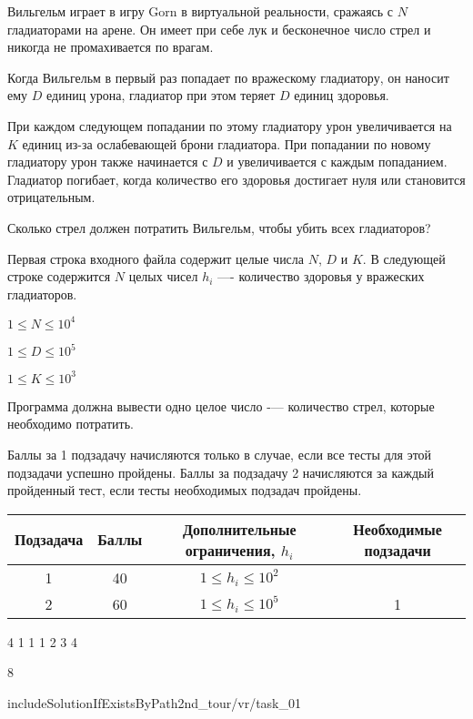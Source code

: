 
Вильгельм играет в игру Gorn в виртуальной реальности, сражаясь с $N$ гладиаторами на арене. Он имеет при себе лук и бесконечное число стрел и никогда не промахивается по врагам. 

Когда Вильгельм в первый раз попадает по вражескому гладиатору, он наносит ему $D$ единиц урона, гладиатор при этом теряет $D$ единиц здоровья. 

При каждом следующем попадании по этому гладиатору урон увеличивается на $K$ единиц из-за ослабевающей брони гладиатора. При попадании по новому гладиатору урон также начинается с $D$ и увеличивается с каждым попаданием. Гладиатор погибает, когда количество его здоровья достигает нуля или становится отрицательным. 

Сколько стрел должен потратить Вильгельм, чтобы убить всех гладиаторов?


Первая строка входного файла содержит целые числа $N$, $D$ и $K$. В следующей строке содержится $N$ целых чисел $h_i$ —- количество здоровья у вражеских гладиаторов.

$1\leq N \leq 10^4$

$1\leq D \leq 10^5$

$1\leq K \leq 10^3$

\outputfmtSection

Программа должна вывести одно целое число -— количество стрел, которые необходимо потратить.

\markSection

Баллы за 1 подзадачу начисляются только в случае, если все тесты для этой подзадачи успешно пройдены. Баллы за подзадачу 2 начисляются за каждый пройденный тест, если тесты необходимых подзадач пройдены.

\begin{table}[H]
    \begin{center}
    \begin{tabular}{|c|c|c|c|}
    \hline
    Подзадача & Баллы & Дополнительные ограничения, $h_i$ & Необходимые подзадачи \\
    \hline
    1 & 40 & $1\leq h_i \leq 10^2$& \\
    \hline
    2 & 60 & $1\leq h_i \leq 10^5$ & 1 \\
    \hline
    
    \end{tabular}
    \end{center}
\end{table} 


\begin{myverbbox}[\small]{\vinput}
    4 1 1
    1 2 3 4
\end{myverbbox}
\begin{myverbbox}[\small]{\voutput}
    8
\end{myverbbox}

includeSolutionIfExistsByPath{2nd_tour/vr/task_01}
